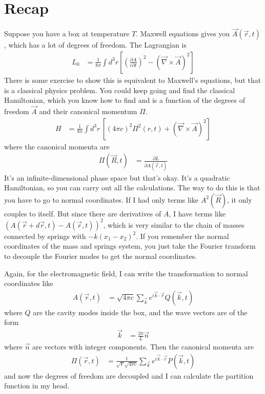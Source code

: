 \section{Recap}
Suppose you have a box at temperature $T$.
Maxwell equations gives you $\vec{A}(\vec{r}, t)$,
which has a lot of degrees of freedom.
The Lagrangian is
\begin{align}
    L_0 &=
    \frac{1}{8\pi} \int d^3r \left[ 
    \left( \frac{\partial A}{c\partial t} \right)^2
    - \left( \vec{\nabla}\times \vec{A} \right)^2
    \right]
\end{align}
There is some exercise to show this is equivalent to Maxwell's equations,
but that is a classical physics problem.
You could keep going and find the classical Hamiltonian,
which you know how to find and is a function of the degrees of freedom $\vec{A}$
and their canonical momentum $\Pi$.
\begin{align}
    H &= 
    \frac{1}{8\pi}
    \int d^3 r\, \left[ 
    \left( 4\pi c \right)^2 
    \Pi^2 (r, t)
    + \left( \vec{\nabla}\times\vec{A}  \right)^2
    \right]
\end{align}
where the canonical momenta are
\begin{align}
    \Pi(\vec{R}, t) &=
    \frac{\partial L}{\partial A(\vec{r}, t)}
\end{align}
It's an infinite-dimensional phase space but that's okay.
It's a quadratic Hamiltonian,
so you can carry out all the calculations.
The way to do this is that you have to go to normal coordinates.
If I had only terms like $A^2(\vec{R})$,
it only couples to itself.
But since there are derivatives of $A$,
I have terms like
$\left( A(\vec{r} + d\vec{r}, t) - A(\vec{r}, t) \right)^2$,
which is very similar to the chain of masses connected by springs
with $-k(x_1 - x_2)^2$.
If you remember the normal coordinates of the mass and springs system,
you just take the Fourier transform to decouple the Fourier modes to get the
normal coordinates.

Again,
for the electromagnetic field,
I can write the transformation to normal coordinates like
\begin{align}
    A(\vec{r},t) &=
    \sqrt{4\pi c}
    \sum_{\vec{k}}
    e^{i\vec{k}\cdot\vec{r}} Q(\vec{k}, t)
\end{align}
where $Q$ are the cavity modes inside the box,
and the wave vectors are of the form
\begin{align}
    \vec{k} &= \frac{2\pi}{L} \vec{n}
\end{align}
where $\vec{n}$ are vectors with integer components.
Then the canonical momenta are
\begin{align}
    \Pi(\vec{r}, t) &=
    \frac{1}{\sqrt{V}\sqrt{4\pi c}} \sum_{\vec{k}}
    e^{i\vec{k}\cdot\vec{r}} P(\vec{k}, t)
\end{align}
and now the degrees of freedom are decoupled and I can calculate the partition
function in my head.

